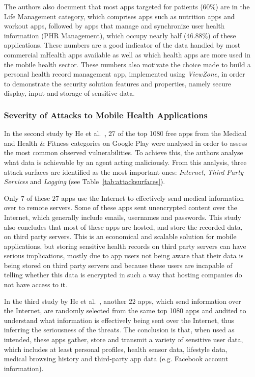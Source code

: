 The authors also document that most apps targeted for patients (60\%) are in the Life Management category, which comprises apps such as nutrition apps and workout apps, followed by apps that manage and synchronize user health information (\ac{PHR} Management), which occupy nearly half (46.88\%) of these applications. These numbers are a good indicator of the data handled by most commercial mHealth apps available as well as which health apps are more used in the mobile health sector. These numbers also motivate the choice made to build a personal health record management app, implemented using \emph{ViewZone}, in order to demonstrate the security solution features and properties, namely secure display, input and storage of sensitive data.

\subsubsection{Severity of Attacks to Mobile Health Applications}
In the second study by He et al.~\cite{he2014security}, 27 of the top 1080 free apps from the Medical and Health \& Fitness categories on Google Play were analysed in order to assess the most common observed vulnerabilities. To achieve this, the authors analyse what data is achievable by an agent acting maliciously. From this analysis, three attack surfaces are identified as the most important ones: \emph{Internet}, \emph{Third Party Services} and \emph{Logging} (see Table~\ref{tab:attacksurfaces}).

Only 7 of these 27 apps use the Internet to effectively send medical information over to remote servers. Some of these apps sent unencrypted content over the Internet, which generally include emails, usernames and passwords. This study also concludes that most of these apps are hosted, and store the recorded data, on third party servers. This is an economical and scalable solution for mobile applications, but storing sensitive health records on third party servers can have serious implications, mostly due to app users not being aware that their data is being stored on third party servers and because these users are incapable of telling whether this data is encrypted in such a way that hosting companies do not have access to it.

In the third study by He et al.~\cite{he2014security}, another 22 apps, which send information over the Internet, are randomly selected from the same top 1080 apps and audited to understand what information is effectively being sent over the Internet, thus inferring the seriousness of the threats. The conclusion is that, when used as intended, these apps gather, store and transmit a variety of sensitive user data, which includes at least personal profiles, health sensor data, lifestyle data, medical browsing history and third-party app data (e.g. Facebook account information).

